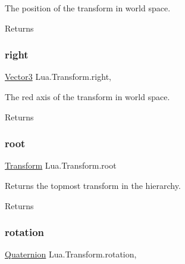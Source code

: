 The position of the transform in world space. 

\begin{DoxyReturn}{Returns}

\end{DoxyReturn}
\mbox{\label{class_lua_1_1_transform_afa7cbcc49408b1a75564f5d379c877ac}} 
\subsubsection{\texorpdfstring{right}{right}}
{\footnotesize\ttfamily \mbox{\hyperlink{class_lua_1_1_vector3}{Vector3}} Lua.\+Transform.\+right\hspace{0.3cm}{\ttfamily [get]}, {\ttfamily [set]}}



The red axis of the transform in world space. 

\begin{DoxyReturn}{Returns}

\end{DoxyReturn}
\mbox{\label{class_lua_1_1_transform_ac54361eab00110ecfa6d6c53ffb78533}} 
\subsubsection{\texorpdfstring{root}{root}}
{\footnotesize\ttfamily \mbox{\hyperlink{class_lua_1_1_transform}{Transform}} Lua.\+Transform.\+root\hspace{0.3cm}{\ttfamily [get]}}



Returns the topmost transform in the hierarchy. 

\begin{DoxyReturn}{Returns}

\end{DoxyReturn}
\mbox{\label{class_lua_1_1_transform_ab0b5488416c3d0f6e3de7b426227198c}} 
\subsubsection{\texorpdfstring{rotation}{rotation}}
{\footnotesize\ttfamily \mbox{\hyperlink{class_lua_1_1_quaternion}{Quaternion}} Lua.\+Transform.\+rotation\hspace{0.3cm}{\ttfamily [get]}, {\ttfamily [set]}}



